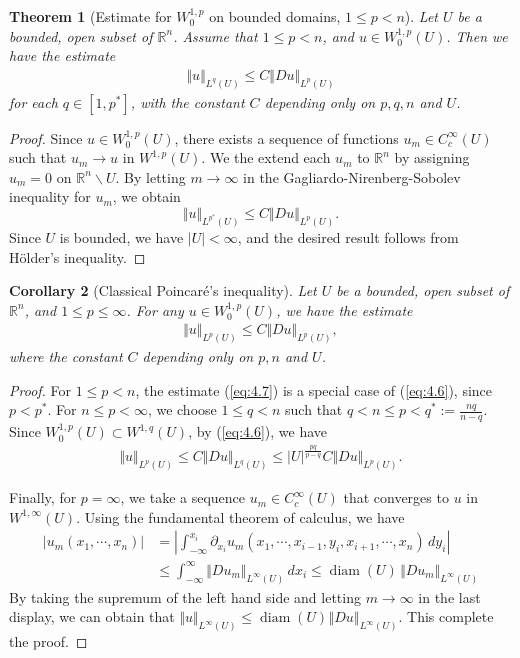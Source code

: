 \documentclass{article}
\numberwithin{equation}{section}
\newcommand{\bbR}{\mathbb{R}}
\DeclareMathOperator{\diam}{diam}
\theoremstyle{plain}
\newtheorem{theorem}{Theorem}[section]
\newtheorem{corollary}[theorem]{Corollary}
\theoremstyle{definition}
\begin{document}
\begin{theorem}[Estimate for $W^{1,p}_0$ on bounded domains, $1\leq p<n$]\label{thm:4.5}
	Let $U$ be a bounded, open subset of $\bbR^n$. Assume that $1\leq p<n$, and $u\in W_0^{1,p}(U)$. Then we have the estimate
	\begin{align}
		\Vert u\Vert_{L^q(U)}\leq C\Vert Du\Vert_{L^p(U)}\label{eq:4.6}
	\end{align}
	for each $q\in[1,p^*]$, with the constant $C$ depending only on $p,q,n$ and $U$.
\end{theorem}
\begin{proof}
Since $u\in W_0^{1,p}(U)$, there exists a sequence of functions $u_m\in C_c^\infty(U)$ such that $u_m\to u$ in $W^{1,p}(U)$. We the extend each $u_m$ to $\bbR^n$ by assigning $u_m=0$ on $\bbR^n\backslash U$. By letting $m\to\infty$ in the Gagliardo-Nirenberg-Sobolev inequality for $u_m$, we obtain $$\Vert u\Vert_{L^{p^*}(U)}\leq C\Vert Du\Vert_{L^p(U)}.$$
Since $U$ is bounded, we have $\vert U\vert<\infty$, and the desired result follows from Hölder's inequality.
\end{proof}

\begin{corollary}[Classical Poincaré's inequality]\label{cor:4.6}
Let $U$ be a bounded, open subset of $\bbR^n$, and $1\leq p\leq \infty$. For any $u\in W_0^{1,p}(U)$, we have the estimate
\begin{align}
	\Vert u\Vert_{L^p(U)}\leq C\Vert Du\Vert_{L^{p}(U)},\label{eq:4.7}
\end{align}
where the constant $C$ depending only on $p,n$ and $U$.
\end{corollary}
\begin{proof}
For $1\leq p<n$, the estimate (\ref{eq:4.7}) is a special case of (\ref{eq:4.6}), since $p<p^*$. For $n\leq p<\infty$, we choose $1\leq q<n$ such that $q< n\leq p<q^*:=\frac{nq}{n-q}$. Since $W_0^{1,p}(U)\subset W^{1,q}(U)$, by (\ref{eq:4.6}), we have
\begin{align*}
	\Vert u\Vert_{L^p(U)}\leq C\Vert Du\Vert_{L^q(U)}\leq \vert U\vert^{\frac{pq}{p-q}} C\Vert Du\Vert_{L^p(U)}.
\end{align*}

Finally, for $p=\infty$, we take a sequence $u_m\in C_c^\infty(U)$ that converges to $u$ in $W^{1,\infty}(U)$. Using the fundamental theorem of calculus, we have
\begin{align*}
	\vert u_m(x_1,\cdots,x_n)\vert&=\left\vert\int_{-\infty}^{x_i}\partial_{x_i}u_m(x_1,\cdots,x_{i-1},y_i,x_{i+1},\cdots,x_n)\,dy_i\right\vert\\
	&\leq\int_{-\infty}^\infty\Vert Du_m\Vert_{L^{\infty}(U)}\,dx_i\leq\diam(U)\,\Vert Du_m\Vert_{L^{\infty}(U)}
\end{align*}
By taking the supremum of the left hand side and letting $m\to\infty$ in the last display, we can obtain that $\Vert u\Vert_{L^\infty(U)}\leq\diam(U)\left\Vert Du\right\Vert_{L^\infty(U)}$. This complete the proof.
\end{proof}
\end{document}

